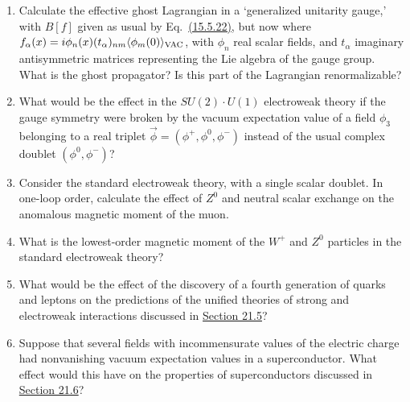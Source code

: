 

\begin{enumerate}
\item Calculate the effective ghost Lagrangian in a `generalized unitarity
gauge,' with $B[f]$ given as usual by
Eq.~\hyperref[eq:15.5.22]{(15.5.22)}, but now where
$f_\alpha(x)=i\phi_n(x)(t_\alpha)_{nm}
\langle\phi_m(0)\rangle_{\rm VAC}$, with $\phi_n$ real scalar fields, and
$t_\alpha$ imaginary antisymmetric matrices representing the Lie algebra of
the gauge group. What is the ghost propagator? Is this part of the
Lagrangian renormalizable?

\item What would be the effect in the $SU(2)\cdot U(1)$ electroweak theory if
the gauge symmetry were broken by the vacuum expectation value of a field
$\phi_3$ belonging to a real triplet
$\vec\phi=(\phi^+,\phi^0,\phi^-)$ instead of the usual complex doublet
$(\phi^0,\phi^-)$?

\item Consider the standard electroweak theory, with a single scalar doublet.
In one-loop order, calculate the effect of $Z^0$ and neutral scalar exchange
on the anomalous magnetic moment of the muon.

\item What is the lowest-order magnetic moment of the $W^+$ and $Z^0$
particles in the standard electroweak theory?

\item What would be the effect of the discovery of a fourth generation of
quarks and leptons on the predictions of the unified theories of strong and
electroweak interactions discussed in
\hyperref[sec:21.5]{Section 21.5}?

\item Suppose that several fields with incommensurate values of the electric
charge had nonvanishing vacuum expectation values in a superconductor. What
effect would this have on the properties of superconductors discussed in
\hyperref[sec:21.6]{Section 21.6}?
\end{enumerate}

